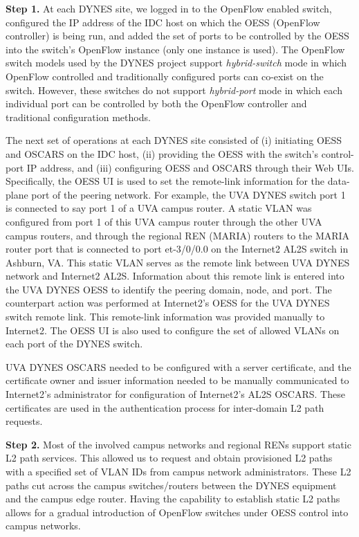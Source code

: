 \textbf{Step 1.} At each DYNES site, we logged in to the OpenFlow
enabled switch, configured the IP address of the IDC host
on which the OESS (OpenFlow controller) is being run, and
added the set of ports to be controlled by the OESS into
the switch's OpenFlow instance (only one instance is used).
The OpenFlow switch models used by the DYNES project
support \emph{hybrid-switch} mode in which OpenFlow controlled
and traditionally configured ports can co-exist on the switch.
However, these switches do not support \emph{hybrid-port} mode in
which each individual port can be controlled by both the
OpenFlow controller and traditional configuration methods.

The next set of operations at each DYNES site consisted of
(i) initiating OESS and OSCARS on the IDC host, (ii) providing the OESS with the switch's control-port IP address,
and (iii) configuring OESS and OSCARS through their Web
UIs. Specifically, the OESS UI is used to set the remote-link
information for the data-plane port of the peering network.
For example, the UVA DYNES switch port 1 is connected
to say port 1 of a UVA campus router. A static VLAN was
configured from port 1 of this UVA campus router through
the other UVA campus routers, and through the regional
REN (MARIA) routers to the MARIA router port that is
connected to port et-3/0/0.0 on the Internet2 AL2S switch
in Ashburn, VA. This static VLAN serves as the remote
link between UVA DYNES network and Internet2 AL2S.
Information about this remote link is entered into the UVA
DYNES OESS to identify the peering domain, node, and
port. The counterpart action was performed at Internet2's
OESS for the UVA DYNES switch remote link. This remote-link information was provided manually to Internet2. The
OESS UI is also used to configure the set of allowed VLANs
on each port of the DYNES switch.

UVA DYNES OSCARS needed to be configured with a server certificate, and the certificate owner and issuer information needed to be manually communicated to Internet2's administrator for configuration of Internet2's AL2S OSCARS. These certificates are used in the authentication
process for inter-domain L2 path requests.

\textbf{Step 2.} Most of the involved campus networks and regional
RENs support static L2 path services. This allowed us to request and obtain provisioned L2 paths with a specified set of
VLAN IDs from campus network administrators. These L2
paths cut across the campus switches/routers between the
DYNES equipment and the campus edge router. Having the
capability to establish static L2 paths allows for a gradual
introduction of OpenFlow switches under OESS control into
campus networks.

